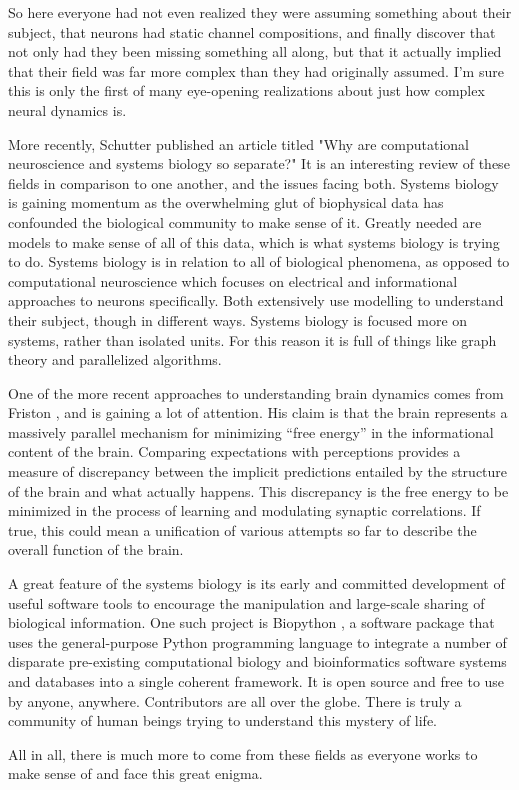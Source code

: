 \documentclass[12pt]{article}
\begin{document}
So here everyone had not even realized they were assuming something about their subject, that neurons had static channel compositions, and finally discover that not only had they been missing something all along, but that it actually implied that their field was far more complex than they had originally assumed.  I'm sure this is only the first of many eye-opening realizations about just how complex neural dynamics is.  

More recently, Schutter \cite{Schutter} published an article titled "Why are computational neuroscience and systems biology so separate?"  It is an interesting review of these fields in comparison to one another, and the issues facing both.  Systems biology is gaining momentum as the overwhelming glut of biophysical data has confounded the biological community to make sense of it.  Greatly needed are models to make sense of all of this data, which is what systems biology is trying to do.  Systems biology is in relation to all of biological phenomena, as opposed to computational neuroscience which focuses on electrical and informational approaches to neurons specifically.  Both extensively use modelling to understand their subject, though in different ways.  Systems biology is focused more on systems, rather than isolated units.  For this reason it is full of things like graph theory and parallelized algorithms.  

One of the more recent approaches to understanding brain dynamics comes from Friston \cite{Friston}, and is gaining a lot of attention.  His claim is that the brain represents a massively parallel mechanism for minimizing ``free energy'' in the informational content of the brain.  Comparing expectations with perceptions provides a measure of discrepancy between the implicit predictions entailed by the structure of the brain and what actually happens.  This discrepancy is the free energy to be minimized in the process of learning and modulating synaptic correlations.  If true, this could mean a unification of various attempts so far to describe the overall function of the brain. 

A great feature of the systems biology is its early and committed development of useful software tools to encourage the manipulation and large-scale sharing of biological information.  One such project is Biopython \cite{Cock}, a software package that uses the general-purpose Python programming language to integrate a number of disparate pre-existing computational biology and bioinformatics software systems and databases into a single coherent framework.  It is open source and free to use by anyone, anywhere.  Contributors are all over the globe.  There is truly a community of human beings trying to understand this mystery of life.  

All in all, there is much more to come from these fields as everyone works to make sense of and face this great enigma.  

\vspace{300pt}



\end{document}
